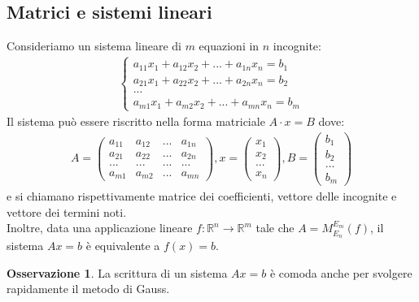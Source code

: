 \documentclass[a4paper]{article}
\theoremstyle{definition}
\newtheorem*{oss}{Osservazione}
\begin{document}
\subsection{Matrici e sistemi lineari}
	Consideriamo un sistema lineare di $m$ equazioni in $n$ incognite:
	\begin{align*}
		\begin{cases}
			a_{11}x_1 + a_{12}x_2 + ... + a_{1n}x_n = b_1 \\
			a_{21}x_1 + a_{22}x_2 + ... + a_{2n}x_n = b_2 \\
			... \\
			a_{m1}x_1 + a_{m2}x_2 + ... + a_{mn}x_n = b_m
		\end{cases}
	\end{align*}
	Il sistema può essere riscritto nella forma matriciale $A \cdot x = B$ dove:
	\begin{align*}
		A = \begin{pmatrix}
			a_{11} & a_{12} & ... & a_{1n} \\
			a_{21} & a_{22} & ... & a_{2n} \\
			...    & ...    & ... & ...    \\
			a_{m1} & a_{m2} & ... & a_{mn}
		\end{pmatrix}, x = \begin{pmatrix}
			x_1 \\
			x_2 \\
			... \\
			x_n
		\end{pmatrix}, B = \begin{pmatrix}
			b_1 \\
			b_2 \\
			... \\
			b_m
		\end{pmatrix}
	\end{align*}
	e si chiamano rispettivamente matrice dei coefficienti, vettore delle incognite e vettore dei termini noti. \\
	Inoltre, data una applicazione lineare $f: \mathbb{R}^n \rightarrow \mathbb{R}^m$ tale che $A = M_{E_n}^{E_m}(f)$, il sistema $Ax = b$ è equivalente a $f(x) = b$.
	\begin{oss}
		La scrittura di un sistema $Ax=b$ è comoda anche per svolgere rapidamente il metodo di Gauss.
	\end{oss}
\end{document}
